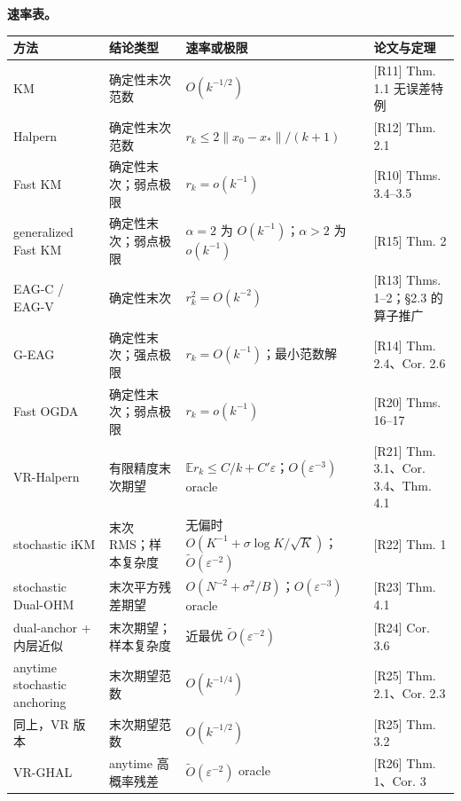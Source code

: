 \documentclass[
  chinese,
  10pt,
  a4paper,
]{article}
\newcounter{none} %
\begin{document}
\textbf{速率表。}

{\def\LTcaptype{none} %
\begin{longtable}[]{@{}
  >{\raggedright\arraybackslash}p{}
  >{\raggedright\arraybackslash}p{}
  >{\raggedright\arraybackslash}p{}
  >{\raggedright\arraybackslash}p{}@{}}
\toprule\noalign{}
\begin{minipage}[b]{\linewidth}\raggedright
方法
\end{minipage} & \begin{minipage}[b]{\linewidth}\raggedright
结论类型
\end{minipage} & \begin{minipage}[b]{\linewidth}\raggedright
速率或极限
\end{minipage} & \begin{minipage}[b]{\linewidth}\raggedright
论文与定理
\end{minipage} \\
\midrule\noalign{}
\endhead
\bottomrule\noalign{}
\endlastfoot
KM & 确定性末次范数 & \(O(k^{-1/2})\) & {[}R11{]} Thm. 1.1 无误差特例 \\
Halpern & 确定性末次范数 & \(r_k\le2\lVert x_0-x_*\rVert/(k+1)\) &
{[}R12{]} Thm. 2.1 \\
Fast KM & 确定性末次；弱点极限 & \(r_k=o(k^{-1})\) & {[}R10{]} Thms.
3.4--3.5 \\
generalized Fast KM & 确定性末次；弱点极限 & \(\alpha=2\) 为
\(O(k^{-1})\)；\(\alpha>2\) 为 \(o(k^{-1})\) & {[}R15{]} Thm. 2 \\
EAG-C / EAG-V & 确定性末次 & \(r_k^2=O(k^{-2})\) & {[}R13{]} Thms.
1--2；§2.3 的算子推广 \\
G-EAG & 确定性末次；强点极限 & \(r_k=O(k^{-1})\)；最小范数解 & {[}R14{]}
Thm. 2.4、Cor. 2.6 \\
Fast OGDA & 确定性末次；弱点极限 & \(r_k=o(k^{-1})\) & {[}R20{]} Thms.
16--17 \\
VR-Halpern & 有限精度末次期望 &
\(\mathbb E r_k\le C/k+C'\varepsilon\)；\(O(\varepsilon^{-3})\) oracle &
{[}R21{]} Thm. 3.1、Cor. 3.4、Thm. 4.1 \\
stochastic iKM & 末次 RMS；样本复杂度 & 无偏时
\(O(K^{-1}+\sigma\log K/\sqrt K)\)；\(\widetilde O(\varepsilon^{-2})\) &
{[}R22{]} Thm. 1 \\
stochastic Dual-OHM & 末次平方残差期望 &
\(O(N^{-2}+\sigma^2/B)\)；\(O(\varepsilon^{-3})\) oracle & {[}R23{]}
Thm. 4.1 \\
dual-anchor + 内层近似 & 末次期望；样本复杂度 & 近最优
\(\widetilde O(\varepsilon^{-2})\) & {[}R24{]} Cor. 3.6 \\
anytime stochastic anchoring & 末次期望范数 & \(O(k^{-1/4})\) &
{[}R25{]} Thm. 2.1、Cor. 2.3 \\
同上，VR 版本 & 末次期望范数 & \(O(k^{-1/2})\) & {[}R25{]} Thm. 3.2 \\
VR-GHAL & anytime 高概率残差 & \(\widetilde O(\varepsilon^{-2})\) oracle
& {[}R26{]} Thm. 1、Cor. 3 \\
\end{longtable}
}
\end{document}
